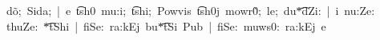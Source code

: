 d\~{o};\, Sida;\, |\, \textltailn e\, \t{ts}\super h0\, mu:\textltailn i;\, \t{ts}\super hi;\, Powvis\, \t{ts}\super h0j\, mowr\~{0};\, le;\, du\t{\=*{d}Z}i:\, |\, \textltailn i\, nu:Ze:\, t\super huZe:\, \t{\=*{t}S}\super hi\, |\, fiSe:\, ra:kEj\, bu\t{\=*{t}S}i\, Pub\, |\, fiSe:\, muws0:\, ra:kEj\, \textltailn e\, \textdoublevertline\, 
